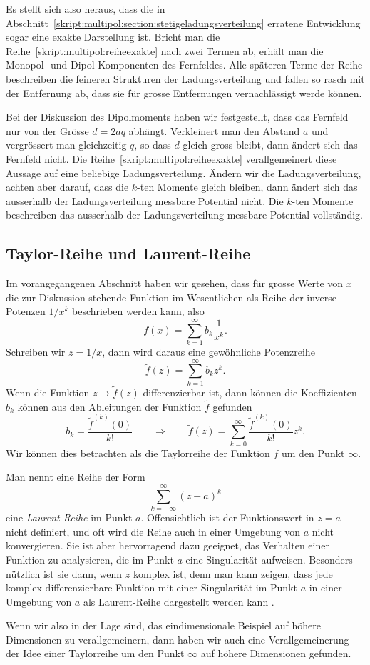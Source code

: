 Es stellt sich also heraus, dass die in
Abschnitt~\ref{skript:multipol:section:stetigeladungsverteilung}
erratene Entwicklung sogar eine exakte Darstellung ist.
Bricht man die Reihe~\eqref{skript:multipol:reiheexakte} nach zwei
Termen ab, erhält man die Monopol- und Dipol-Komponenten des
Fernfeldes.
Alle späteren Terme der Reihe beschreiben die feineren Strukturen
der Ladungsverteilung und fallen so rasch mit der Entfernung ab,
dass sie für grosse Entfernungen vernachlässigt werde können.

Bei der Diskussion des Dipolmoments haben wir festgestellt, dass das
Fernfeld nur von der Grösse $d=2aq$ abhängt.
Verkleinert man den Abstand $a$ und vergrössert man gleichzeitig $q$,
so dass $d$ gleich gross bleibt, dann ändert sich das Fernfeld nicht.
Die Reihe~\eqref{skript:multipol:reiheexakte} verallgemeinert diese
Aussage auf eine beliebige Ladungsverteilung.
Ändern wir die Ladungsverteilung, achten aber darauf, dass die
$k$-ten Momente gleich bleiben, dann ändert sich das ausserhalb der
Ladungsverteilung messbare Potential nicht.
Die $k$-ten Momente beschreiben das ausserhalb der Ladungsverteilung
messbare Potential vollständig.

\subsection{Taylor-Reihe und Laurent-Reihe}
Im vorangegangenen Abschnitt haben wir gesehen, dass für grosse Werte von
$x$ die zur Diskussion stehende Funktion im Wesentlichen als Reihe
der inverse Potenzen $1/x^k$ beschrieben werden kann, also
\[
f(x)=\sum_{k=1}^\infty b_k\frac1{x^k}.
\]
Schreiben wir $z=1/x$, dann wird daraus eine gewöhnliche Potenzreihe
\[
\tilde f(z)=\sum_{k=1}^\infty b_k z^k.
\]
Wenn die Funktion $z\mapsto \tilde f(z)$ differenzierbar ist, dann
können die Koeffizienten $b_k$ können aus den Ableitungen der Funktion
$\tilde f$ gefunden
\begin{equation}
b_k=\frac{\tilde f^{(k)}(0)}{k!}
\qquad\Rightarrow\qquad
\tilde f(z)
=
\sum_{k=0}^\infty \frac{\tilde f^{(k)}(0)}{k!}z^k.
\end{equation}
Wir können dies betrachten als die Taylorreihe der Funktion $f$ um
den Punkt $\infty$.

Man nennt eine Reihe der Form
\[
\sum_{k=-\infty}^{\infty} (z-a)^k
\]
eine {\em Laurent-Reihe} im Punkt $a$.
Offensichtlich ist der Funktionswert in $z=a$ nicht definiert, und
oft wird die Reihe auch in einer Umgebung von $a$ nicht konvergieren.
Sie ist aber hervorragend dazu geeignet, das Verhalten einer Funktion
zu analysieren, die im Punkt $a$ eine Singularität aufweisen.
Besonders nützlich ist sie dann, wenn $z$ komplex ist, denn man
kann zeigen, dass jede komplex differenzierbare Funktion mit einer
Singularität im Punkt $a$ in einer Umgebung von $a$ als Laurent-Reihe
dargestellt werden kann \cite{skript:mathsemdgl}.

Wenn wir also in der Lage sind, das eindimensionale Beispiel auf höhere
Dimensionen zu verallgemeinern, dann haben wir auch eine Verallgemeinerung
der Idee einer Taylorreihe um den Punkt $\infty$ auf höhere Dimensionen
gefunden.








